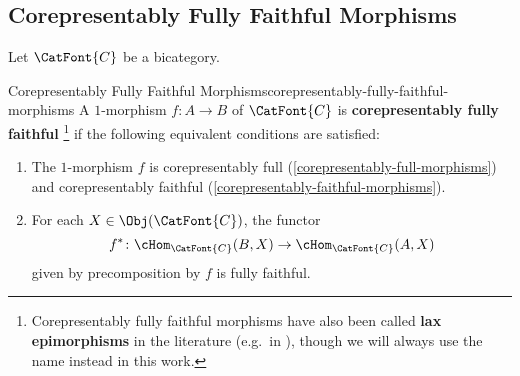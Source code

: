 \subsection{Corepresentably Fully Faithful Morphisms}\label{subsection-corepresentably-fully-faithful-morphisms}
Let $\CatFont{C}$ be a bicategory.
\begin{definition}{Corepresentably Fully Faithful Morphisms}{corepresentably-fully-faithful-morphisms}%
    A $1$-morphism $f\colon A\to B$ of $\CatFont{C}$ is \textbf{corepresentably fully faithful}%
    \footnote{%
        Corepresentably fully faithful morphisms have also been called \textbf{lax epimorphisms} in the literature (e.g.\ in \cite{on-functors-which-are-lax-epimorphisms}), though we will always use the name  instead in this work.
        \par\vspace*{-1.75\baselineskip}
    } %
    if the following equivalent conditions are satisfied:
    \begin{enumerate}
        \item\label{corepresentably-fully-faithful-morphisms-1}The $1$-morphism $f$ is corepresentably full (\cref{corepresentably-full-morphisms}) and corepresentably faithful (\cref{corepresentably-faithful-morphisms}).
        \item\label{corepresentably-fully-faithful-morphisms-2}For each $X\in\Obj(\CatFont{C})$, the functor
            \[
                f^{*}%
                \colon%
                \cHom_{\CatFont{C}}(B,X)%
                \to%
                \cHom_{\CatFont{C}}(A,X)%
            \]%
            given by precomposition by $f$ is fully faithful.
    \end{enumerate}
\end{definition}
